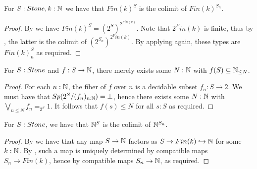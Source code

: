 \begin{lemma}\label{ScottFiniteCodomain}
  For $S:\Stone, k:\N$ we have that $Fin(k)^S$ is the colimit of $Fin(k)^{S_n}$. 
\end{lemma}
\begin{proof}
  By  we have $Fin(k)^S = (2^S)^{2^{Fin(k)}}$.
  Note that $2^Fin(k)$ is finite, thus by , the latter
  is the colimit of $(2^{S_n})^{2^Fin(k)}$. 
  By applying  again, these types are $Fin(k)^S_n$ as required. 
\end{proof}
\begin{lemma}\label{MapsStoneToNareBounded}
  For $S:\Stone$ and $f:S \to \mathbb{N}$, there merely exists some $N:\mathbb{N}$ with $f(S)\subseteq \mathbb{N}_{\leq N}$. 
\end{lemma}
\begin{proof}
  For each $n:\mathbb{N}$, the fiber of $f$ over $n$ is a decidable subset $f_n:S \to 2$. 
  We must have that $Sp(2^S/(f_n)_{n:\mathbb{N}}) = \bot$, hence there exists some $N:\mathbb{N}$ with 
  $\bigvee_{n\leq N} f_n =_{2^S} 1 $. 
  It follows that $f(s)\leq N$ for all $s:S$ as required. 
\end{proof}

\begin{corollary}\label{scott-continuity}
  For $S:\Stone$, we have that $\mathbb{N}^S$ is the colimit of $\mathbb{N}^{S_n}$. 
\end{corollary}
\begin{proof}
  By  we have that any map $S\to \mathbb{N}$ factors as 
  $S \to Fin(k)\hookrightarrow \mathbb{N}$ for some $k:\mathbb{N}$. 
  By , such a map is uniquely determined by 
  compatible maps $S_n \to Fin(k)$, hence by compatible maps $S_n \to \mathbb{N}$, 
  as required. 
\end{proof} 



